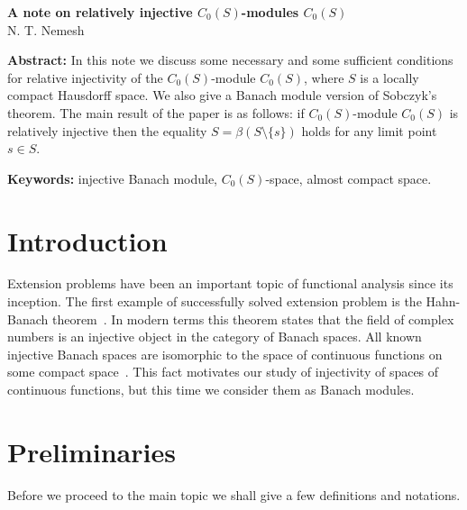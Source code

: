 \documentclass[12pt]{article}
\begin{document}
\begin{center}
    \Large \textbf{A note on relatively injective $C_0(S)$-modules
        $C_0(S)$}\\[0.5cm]
    \small {N. T. Nemesh}\\[0.5cm]
\end{center}

\thispagestyle{empty}

\medskip
\textbf{Abstract:} In this note we discuss some necessary and some sufficient
conditions for relative injectivity of the $C_0(S)$-module $C_0(S)$, where $S$
is a locally compact Hausdorff space. We also give a Banach module version of
Sobczyk's theorem. The main result of the paper is as follows: if
$C_0(S)$-module $C_0(S)$ is relatively injective then the equality
$S=\beta(S\setminus \{s\})$ holds for any limit point $s\in S$.
\medskip

\textbf{Keywords:} injective Banach module, $C_0(S)$-space, almost compact
space.

\bigskip


\section{Introduction}\label{SectionIntroduction}

Extension problems have been an important topic of functional analysis since its
inception. The first example of successfully solved extension problem is the
Hahn-Banach
theorem~\cite{HahnLinSystInLinSp,BanachOnLinFuncI,BanachOnLinFuncII}. In modern
terms this theorem states that the field of complex numbers is an injective
object in the category of Banach spaces. All known injective Banach spaces are
isomorphic to the space of continuous functions on some compact
space~\cite{BlascIvorConstrInjSpCK}. This fact motivates our study of
injectivity of spaces of continuous functions, but this time we consider them as
Banach modules.


\section{Preliminaries}\label{SectionPreliminaries} Before we proceed to the
main topic we shall give a few definitions and notations.
\end{document}
